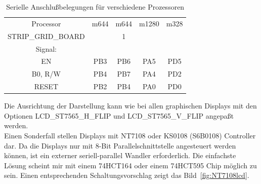 \begin{table}[H]
  \begin{center}
    \begin{tabular}{| c || c | c | c | c |}
    \hline
 Processor  & m644  & m644 & m1280  & m328 \\
STRIP\_GRID\_BOARD &       &   1   &        &     \\
    \hline
    \hline
Signal:     &       &       &        &         \\
  EN        &  PB3  & PB6   &  PA5   & PD5     \\
    \hline
  B0, R/W   &  PB4  & PB7   &  PA4   & PD2      \\
    \hline
  RESET     &  PB2  & PB4   &  PA0   & PD0      \\
    \hline
    \end{tabular}
  \end{center}
  \caption{Serielle Anschlußbelegungen für verschiedene Prozessoren}
\label{tab:ser-processor}
\end{table}

Die Ausrichtung der Darstellung kann wie bei allen graphischen Displays  mit den Optionen
LCD\_ST7565\-\_H\_FLIP und LCD\_ST7565\-\_V\_FLIP angepaßt werden. \\

Einen Sonderfall stellen Displays mit NT7108 oder KS0108 (S6B0108) Controller dar. Da die Displays nur mit 8-Bit Parallelschnittstelle
angesteuert werden können, ist ein externer seriell-parallel Wandler erforderlich.
Die einfachste Lösung scheint mir mit einem 74HCT164 oder einem 74HCT595 Chip möglich zu sein.
Einen entsprechenden Schaltungsvorschlag zeigt das Bild~\ref{fig:NT7108lcd}.

